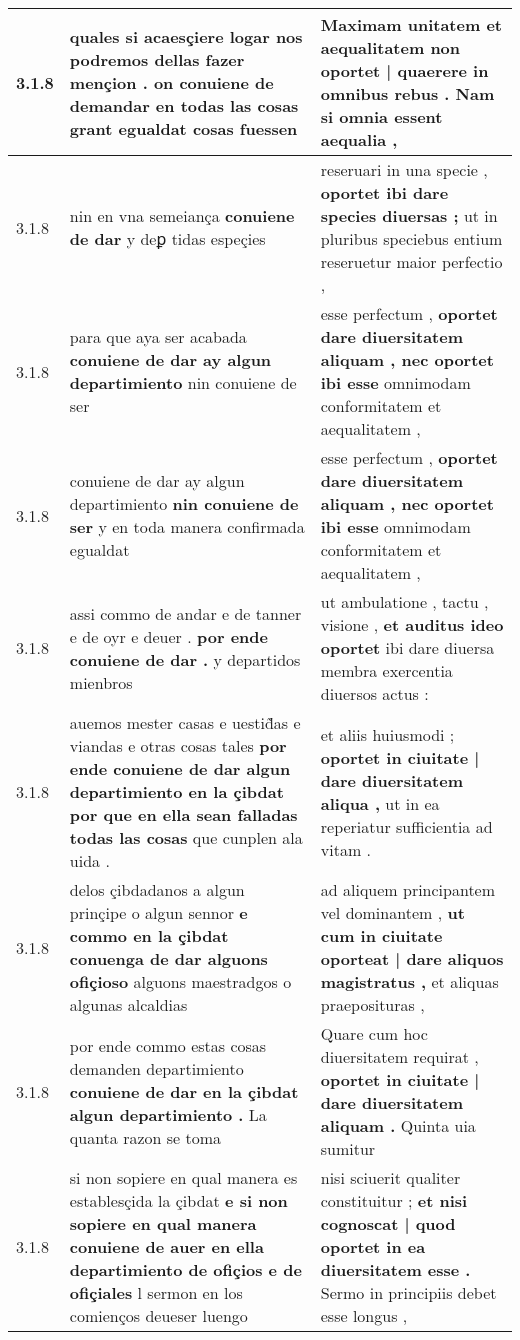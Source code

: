 \begin{tabular}{|p{1cm}|p{6.5cm}|p{6.5cm}|}
3.1.8 & quales si acaesçiere logar nos podremos dellas fazer mençion . \textbf{ on conuiene de demandar en todas las cosas } grant egualdat cosas fuessen & Maximam unitatem et aequalitatem \textbf{ non oportet | quaerere in omnibus rebus . } Nam si omnia essent aequalia , \\\hline
3.1.8 & nin en vna semeiança \textbf{ conuiene de dar } y deꝑ tidas espeçies & reseruari in una specie , \textbf{ oportet ibi dare species diuersas ; } ut in pluribus speciebus entium reseruetur maior perfectio , \\\hline
3.1.8 & para que aya ser acabada \textbf{ conuiene de dar ay algun departimiento } nin conuiene de ser & esse perfectum , \textbf{ oportet dare diuersitatem aliquam , nec oportet ibi esse } omnimodam conformitatem et aequalitatem , \\\hline
3.1.8 & conuiene de dar ay algun departimiento \textbf{ nin conuiene de ser } y en toda manera confirmada egualdat & esse perfectum , \textbf{ oportet dare diuersitatem aliquam , nec oportet ibi esse } omnimodam conformitatem et aequalitatem , \\\hline
3.1.8 & assi commo de andar e de tanner e de oyr e deuer . \textbf{ por ende conuiene de dar . } y departidos mienbros & ut ambulatione , tactu , visione , \textbf{ et auditus ideo oportet } ibi dare diuersa membra exercentia diuersos actus : \\\hline
3.1.8 & auemos mester casas e uestid̃as e viandas e otras cosas tales \textbf{ por ende conuiene de dar algun departimiento en la çibdat por que en ella sean falladas todas las cosas } que cunplen ala uida . & et aliis huiusmodi ; \textbf{ oportet in ciuitate | dare diuersitatem aliqua , } ut in ea reperiatur sufficientia ad vitam . \\\hline
3.1.8 & delos çibdadanos a algun prinçipe o algun sennor \textbf{ e commo en la çibdat conuenga de dar alguons ofiçioso } alguons maestradgos o algunas alcaldias & ad aliquem principantem vel dominantem , \textbf{ ut cum in ciuitate oporteat | dare aliquos magistratus , } et aliquas praeposituras , \\\hline
3.1.8 & por ende commo estas cosas demanden departimiento \textbf{ conuiene de dar en la çibdat algun departimiento . } La quanta razon se toma & Quare cum hoc diuersitatem requirat , \textbf{ oportet in ciuitate | dare diuersitatem aliquam . } Quinta uia sumitur \\\hline
3.1.8 & si non sopiere en qual manera es establesçida la çibdat \textbf{ e si non sopiere en qual manera conuiene de auer en ella departimiento de ofiçios e de ofiçiales } l sermon en los comienços deueser luengo & nisi sciuerit qualiter constituitur ; \textbf{ et nisi cognoscat | quod oportet in ea diuersitatem esse . } Sermo in principiis debet esse longus , \\\hline

\end{tabular}
